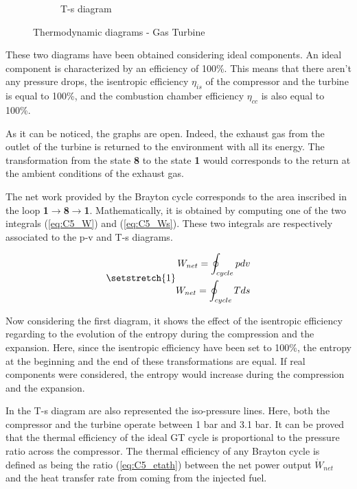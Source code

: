 \begin{figure}[H]
\begin{subfigure}[b]{0.4\textwidth}
         \caption{T-s diagram}
         \label{fig:C5_Ts_GT}
     \end{subfigure}
        \caption{Thermodynamic diagrams - Gas Turbine}
        \label{fig:C5_thermo_diagram_GT}
\end{figure}

These two diagrams have been obtained considering ideal components. An ideal component is characterized by an efficiency of 100\%. This means that there aren't any pressure drops, the isentropic efficiency $\eta_{is}$ of the compressor and the turbine is equal to 100\%, and the combustion chamber efficiency $\eta_{cc}$ is also equal to 100\%.

As it can be noticed, the graphs are open. Indeed, the exhaust gas from the outlet of the turbine is returned to the environment with all its energy. The transformation from the state \textbf{8} to the state \textbf{1} would corresponds to the return at the ambient conditions of the exhaust gas. 

The net work provided by the Brayton cycle corresponds to the area inscribed in the loop \textbf{1}$\rightarrow$\textbf{8}$\rightarrow$\textbf{1}. Mathematically, it is obtained by computing one of the two integrals (\ref{eq:C5_W}) and (\ref{eq:C5_Ws}). These two integrals are respectively associated to the p-v and T-s diagrams.

\begin{subequations}  
\setstretch{1}
\begin{align}
    W_{net} = \oint_{cycle}pdv\label{eq:C5_W}\\
    W_{net} = \oint_{cycle}Tds\label{eq:C5_Ws}
\end{align}
\end{subequations}

Now considering the first diagram, it shows the effect of the isentropic efficiency regarding to the evolution of the entropy during the compression and the expansion. Here, since the isentropic efficiency have been set to 100\%, the entropy at the beginning and the end of these transformations are equal. If real components were considered, the entropy would increase during the compression and the expansion.

In the T-s diagram are also represented the iso-pressure lines. Here, both the compressor and the turbine operate between 1 bar and 3.1 bar. It can be  proved that the thermal efficiency of the ideal GT cycle is proportional to the pressure ratio across the compressor. The thermal efficiency of any Brayton cycle is defined as being the ratio (\ref{eq:C5_etath}) between the net power output $\dot{W}_{net}$ and the heat transfer rate from coming from the injected fuel.

